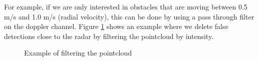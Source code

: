 \documentclass[12pt]{article}
\begin{document}
For example, if we are only interested in obstacles that are moving between 0.5 m/s and 1.0 m/s (radial velocity), this can be done by using a pass through filter on the doppler channel.
Figure \ref{fig:filters} shows an example where we delete false detections close to the radar by filtering the pointcloud by intensity.
\begin{figure}[h]%
    \centering
    \qquad
    \caption{Example of filtering the pointcloud}%
    \label{fig:filters}
\end{figure}

\end{document}

